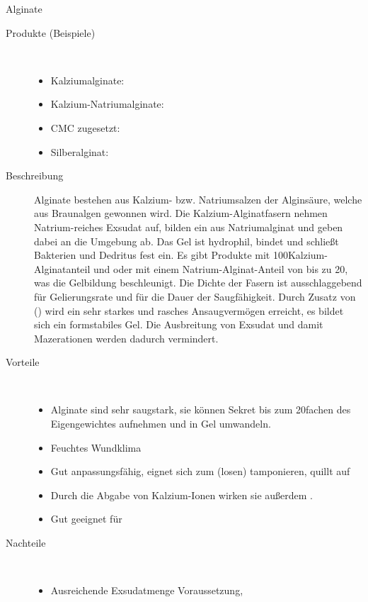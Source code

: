 \TextSlide
{Alginate}
{
\begin{description}
  \item[Produkte (Beispiele)] ~
\begin{itemize}
    \item Kalziumalginate: 
    \item Kalzium-Natriumalginate: 
    \item CMC zugesetzt: 
    \item Silberalginat: 
  \end{itemize}
  
  \item[Beschreibung] Alginate bestehen aus Kalzium-  bzw.
  Natriumsalzen der Alginsäure, welche aus Braunalgen
  gewonnen wird. 
  Die Kalzium-Alginatfasern nehmen Natrium-reiches Exsudat
  auf, bilden ein  aus Natriumalginat und
  geben dabei  an die Umgebung ab. Das Gel
  ist hydrophil, bindet  und
  schließt Bakterien und Dedritus fest ein. Es gibt Produkte mit
  100\PC* Kalzium-Alginatanteil und oder mit einem
  Natrium-Alginat-Anteil von bis zu 20\PC*, was die
  Gelbildung beschleunigt.
  Die Dichte der Fasern ist ausschlaggebend für
  Gelierungsrate und für die Dauer der Saugfähigkeit. Durch
  Zusatz von  () wird ein
  sehr starkes und rasches Ansaugvermögen erreicht, es
  bildet sich ein formstabiles Gel. Die Ausbreitung von
  Exsudat und damit Mazerationen werden dadurch vermindert.
  \item[Vorteile] ~
  \begin{itemize}
    \item[$+$] Alginate sind sehr saugstark, sie können
    Sekret bis zum 20fachen des Eigengewichtes aufnehmen und
    in Gel umwandeln.
    \item[$+$] Feuchtes Wundklima
    \item[$+$] Gut anpassungsfähig, eignet sich zum (losen)
    tamponieren, quillt auf
    \item[$+$] Durch die Abgabe von Kalzium-Ionen wirken sie
    außerdem .
    \item[$+$] Gut geeignet für 
  \end{itemize}
  \item[Nachteile] ~
  \begin{itemize}
    \item[$-$] Ausreichende Exsudatmenge Voraussetzung,

\end{itemize}
\end{description}}
